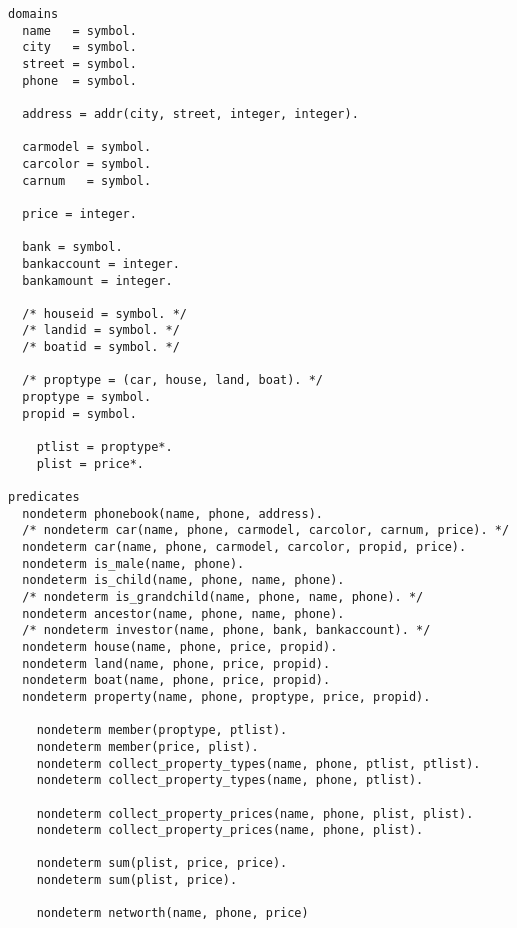\documentclass[a4paper,oneside,14pt]{extarticle}
\begin{document}

\setcounter{page}{2}
\renewcommand{\contentsname}{СОДЕРЖАНИЕ}


\begin{lstlisting}
domains
  name   = symbol.
  city   = symbol.
  street = symbol.
  phone  = symbol.

  address = addr(city, street, integer, integer).

  carmodel = symbol.
  carcolor = symbol.
  carnum   = symbol.

  price = integer.

  bank = symbol.
  bankaccount = integer.
  bankamount = integer.

  /* houseid = symbol. */
  /* landid = symbol. */
  /* boatid = symbol. */

  /* proptype = (car, house, land, boat). */
  proptype = symbol.
  propid = symbol.

	ptlist = proptype*.
	plist = price*.

predicates
  nondeterm phonebook(name, phone, address).
  /* nondeterm car(name, phone, carmodel, carcolor, carnum, price). */
  nondeterm car(name, phone, carmodel, carcolor, propid, price).
  nondeterm is_male(name, phone).
  nondeterm is_child(name, phone, name, phone).
  /* nondeterm is_grandchild(name, phone, name, phone). */
  nondeterm ancestor(name, phone, name, phone).
  /* nondeterm investor(name, phone, bank, bankaccount). */
  nondeterm house(name, phone, price, propid).
  nondeterm land(name, phone, price, propid).
  nondeterm boat(name, phone, price, propid).
  nondeterm property(name, phone, proptype, price, propid).

	nondeterm member(proptype, ptlist).
	nondeterm member(price, plist).
	nondeterm collect_property_types(name, phone, ptlist, ptlist).
	nondeterm collect_property_types(name, phone, ptlist).

	nondeterm collect_property_prices(name, phone, plist, plist).
	nondeterm collect_property_prices(name, phone, plist).

	nondeterm sum(plist, price, price).
	nondeterm sum(plist, price).

	nondeterm networth(name, phone, price)


\end{lstlisting}
\end{document}
